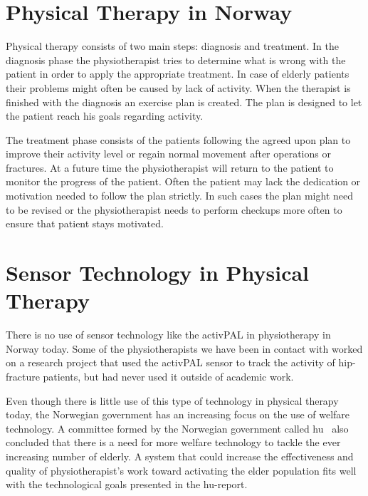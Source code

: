 \section{Physical Therapy in Norway}
Physical therapy consists of two main steps: diagnosis and treatment. In the diagnosis phase the physiotherapist tries to determine what is wrong with the patient in order to apply the appropriate treatment. In case of elderly patients their problems might often be caused by lack of activity. When the therapist is finished with the diagnosis an exercise plan is created. The plan is designed to let the patient reach his goals regarding activity.

The treatment phase consists of the patients following the agreed upon plan to improve their activity level or regain normal movement after operations or fractures. At a future time the physiotherapist will return to the patient to monitor the progress of the patient. Often the patient may lack the dedication or motivation needed to follow the plan strictly. In such cases the plan might need to be revised or the physiotherapist needs to perform checkups more often to ensure that patient stays motivated.

\section{Sensor Technology in Physical Therapy}
There is no use of sensor technology like the activPAL in physiotherapy in Norway today. Some of the physiotherapists we have been in contact with worked on a research project that used the activPAL sensor to track the activity of hip-fracture patients, but had never used it outside of academic work.

Even though there is little use of this type of technology in physical therapy today, the Norwegian government has an increasing focus on the use of welfare technology. A committee formed by the Norwegian government called \gls{hu}~\cite{haagen} also concluded that there is a need for more welfare technology to tackle the ever increasing number of elderly. A system that could increase the effectiveness and quality of physiotherapist's work toward activating the elder population fits well with the technological goals presented in the \gls{hu}-report.  


